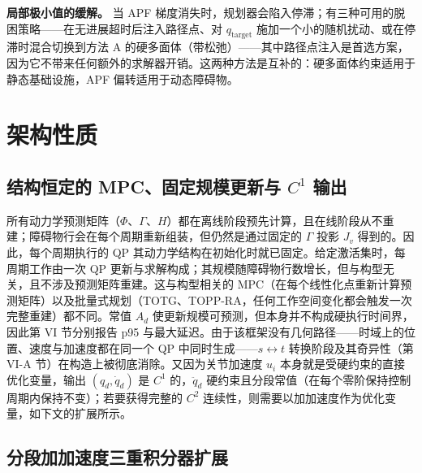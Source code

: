 \textbf{局部极小值的缓解。} 当 APF 梯度消失时，规划器会陷入停滞；有三种可用的脱困策略——在无进展超时后注入路径点、对 \(q_\text{target}\) 施加一个小的随机扰动、或在停滞时混合切换到方法 A 的硬多面体（带松弛）——其中路径点注入是首选方案，因为它不带来任何额外的求解器开销。这两种方法是互补的：硬多面体约束适用于静态基础设施，APF 偏转适用于动态障碍物。

\section{架构性质}\label{v.-architectural-properties}

\subsection{结构恒定的 MPC、固定规模更新与 \texorpdfstring{\(C^1\)}{C1} 输出}\label{a.-constant-structure-mpc-and-bounded-replanning-latency}

所有动力学预测矩阵（\(\Phi\)、\(\Gamma\)、\(H\)）都在离线阶段预先计算，且在线阶段从不重建；障碍物行会在每个周期重新组装，但仍然是通过固定的 \(\Gamma\) 投影 \(J_v\) 得到的。因此，每个周期执行的 QP 其动力学结构在初始化时就已固定。给定激活集时，每周期工作由一次 QP 更新与求解构成；其规模随障碍物行数增长，但与构型无关，且不涉及预测矩阵重建。这与构型相关的 MPC（在每个线性化点重新计算预测矩阵）以及批量式规划（TOTG、TOPP-RA，任何工作空间变化都会触发一次完整重建）都不同。常值 \(A_d\) 使更新规模可预测，但本身并不构成硬执行时间界，因此第 VI 节分别报告 p95 与最大延迟。由于该框架没有几何路径——时域上的位置、速度与加速度都在同一个 QP 中同时生成——\(s\leftrightarrow t\) 转换阶段及其奇异性（第 VI-A 节）在构造上被彻底消除。又因为关节加速度 \(u_i\) 本身就是受硬约束的直接优化变量，输出 \((q_d,\dot q_d)\) 是 \(C^1\) 的，\(\ddot q_d\) 硬约束且分段常值（在每个零阶保持控制周期内保持不变）；若要获得完整的 \(C^2\) 连续性，则需要以加加速度作为优化变量，如下文的扩展所示。

\subsection{分段加加速度三重积分器扩展}\label{d.-piecewise-jerk-triple-integrator-extension-for-continuous-acceleration}

